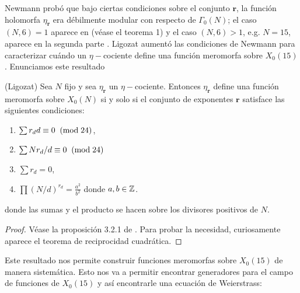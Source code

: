 \documentclass[../../tesis_maestria]{subfiles}
\begin{document}
Newmann probó que bajo ciertas condiciones sobre el conjunto $\mathbf{r}$, la función holomorfa $\eta_\mathbf{r}$ era débilmente modular con respecto de $\Gamma_0(N)$; el caso $(N,6)=1$ aparece en \cite{NewmanCAAOACOMFI} (véase el teorema 1) y el caso $(N,6)>1$, e.g. $N=15$, aparece en la segunda parte \cite{NewmanCAAOACOMFII}. Ligozat aumentó las condiciones de Newmann para caracterizar cuándo un $\eta-$cociente define una función meromorfa sobre $X_0(15)$. Enunciamos este resultado

\begin{thm}\label{thm:ligozats}
	(Ligozat) Sea $N$ fijo y sea $\eta_\mathbf{r}$ un $\eta-$cociente. Entonces $\eta_\mathbf{r}$ define una función meromorfa sobre $X_0(N)$ si y solo si el conjunto de exponentes $\mathbf{r}$ satisface las siguientes condiciones:
	\begin{enumerate}[label=(\roman*)]
		\item $\sum r_d d \equiv 0 \;\;(\mathrm{mod}\; 24)$,
		\item $\sum N r_d/d\equiv0\;\;(\mathrm{mod}\; 24)$
		\item $\sum r_d=0$,
		\item $\prod (N/d)^{r_d}=\frac{a^2}{b^2}$ donde $a,b\in\mathbb{Z}$.
	\end{enumerate}
	donde las sumas y el producto se hacen sobre los divisores positivos de $N$.
\end{thm}
\begin{proof}
	Véase la proposición 3.2.1 de \cite{LigozatCMDG1}. Para probar la necesidad, curiosamente aparece el teorema de reciprocidad cuadrática.
\end{proof}

Este resultado nos permite construir funciones meromorfas sobre $X_0(15)$ de manera sistemática. Esto nos va a permitir encontrar generadores para el campo de funciones de $X_0(15)$ y así encontrarle una ecuación de Weierstrass:
\end{document}

